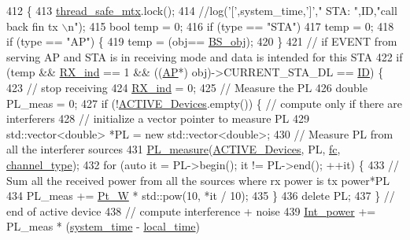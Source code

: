 \begin{DoxyCode}
412                                                   \{
413     \hyperlink{STA_8cpp_aaa6351021119738f7a064778438f782c}{thread\_safe\_mtx}.lock();
414     \textcolor{comment}{//log('[',system\_time,']'," STA: ",ID,"call back fin tx \(\backslash\)n");}
415     \textcolor{keywordtype}{bool} temp = 0;
416     \textcolor{keywordflow}{if} (type == \textcolor{stringliteral}{"STA"})
417         temp = 0;
418     \textcolor{keywordflow}{if} (type == \textcolor{stringliteral}{"AP"}) \{
419         temp = (obj== \hyperlink{classSTA_abfa329ed1a4539a0f88ef568f41aaac9}{BS\_obj});
420     \}
421     \textcolor{comment}{// if EVENT from serving AP and STA is in receiving mode and data is intended for this STA}
422     \textcolor{keywordflow}{if} (temp && \hyperlink{classSTA_aace6d664e5ecf495177277ef030141c6}{RX\_ind} == 1 && ((\hyperlink{classAP}{AP}*) obj)->CURRENT\_STA\_DL == \hyperlink{classSTA_a9376abb50969b5b16aeb5fb0e449e6f7}{ID}) \{
423         \textcolor{comment}{// stop receiving}
424         \hyperlink{classSTA_aace6d664e5ecf495177277ef030141c6}{RX\_ind} = 0;
425         \textcolor{comment}{// Measure the PL}
426         \textcolor{keywordtype}{double} PL\_meas = 0;
427         \textcolor{keywordflow}{if} (!\hyperlink{classSTA_a536179d10f961ae6f7330b980a13668e}{ACTIVE\_Devices}.empty()) \{ \textcolor{comment}{// compute only if there are interferers}
428             \textcolor{comment}{// initialize a vector pointer to measure PL}
429             std::vector<double> *PL = \textcolor{keyword}{new} std::vector<double>;
430             \textcolor{comment}{// Measure PL from all the interferer sources}
431             \hyperlink{PL__measure_8cpp_afb433c5f099becf495d3c9d29ffc707d}{PL\_measure}(\hyperlink{classSTA_a536179d10f961ae6f7330b980a13668e}{ACTIVE\_Devices}, PL, \hyperlink{classSTA_a07c54eac4b0f34790e0a2e4dcbe720ac}{fc}, 
      \hyperlink{classSTA_a5d1a873bdd6733103441abadf4db1475}{channel\_type});
432             \textcolor{keywordflow}{for} (\textcolor{keyword}{auto} it = PL->begin(); it != PL->end(); ++it) \{
433                 \textcolor{comment}{// Sum all the received power from all the sources where rx power is tx power*PL}
434                 PL\_meas += \hyperlink{classSTA_a8ec6260021c741ccc08a6ec25793c1f3}{Pt\_W} * std::pow(10, *it / 10);
435             \}
436             \textcolor{keyword}{delete} PL;
437         \} \textcolor{comment}{// end of active device}
438           \textcolor{comment}{// compute interference + noise }
439         \hyperlink{classSTA_aa1e60f7391861b468314437fbad67280}{Int\_power} += PL\_meas * (\hyperlink{STA_8cpp_aaa03a568dc1d9d3391286ea24b9cfb63}{system\_time} - \hyperlink{classSTA_ad4800b03ee83fe283cc33089eb438359}{local\_time})

\end{DoxyCode}
